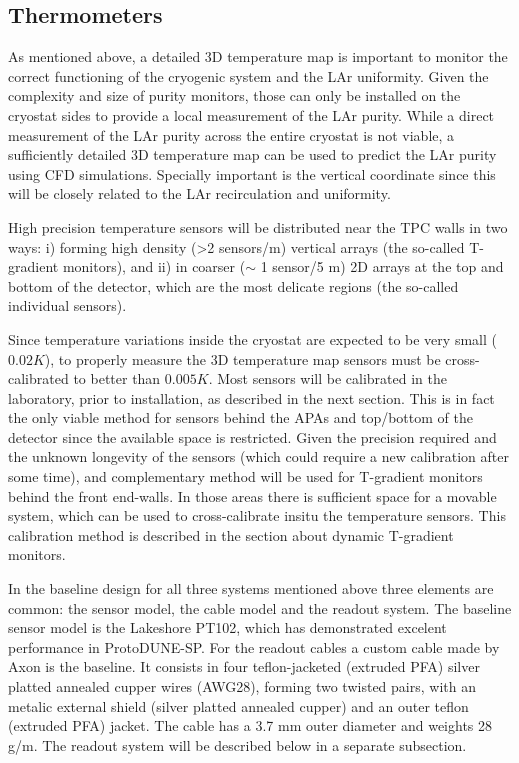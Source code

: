 \subsection{Thermometers}
\label{sec:fdsp-slow-cryo-therm}

As mentioned above, a detailed 3D temperature map is important to monitor the correct functioning of the cryogenic system and the LAr uniformity.
Given the complexity and size of purity monitors, those can only be installed on the cryostat sides to provide a local measurement of
the LAr purity. While a direct measurement of the LAr purity across the entire cryostat is not viable, a sufficiently detailed 3D temperature map
can be used to predict the LAr purity using CFD simulations. Specially important is the vertical coordinate since this will be closely related to
the LAr recirculation and uniformity. 

High precision temperature sensors will be distributed near the TPC walls in two ways:
i) forming high density (>2 sensors/m) vertical arrays (the so-called T-gradient monitors), and ii) in coarser ($\sim$ 1 sensor/5 m) 2D arrays 
at the top and bottom of the detector, which are the most delicate regions (the so-called individual sensors).   

Since temperature variations inside the cryostat are expected to be very small ($0.02 K$), to properly measure the 3D temperature map 
sensors must be cross-calibrated to better than $0.005 K$. Most sensors will be calibrated in the laboratory, prior to installation,
as described in the next section. This is in fact the only viable method for sensors behind the APAs and top/bottom of the detector since the available space is restricted.  
Given the precision required and the unknown longevity of the sensors (which could require a new calibration after some time), and complementary method
will be used for T-gradient monitors behind the front end-walls. In those areas there is sufficient space for a movable system, which can be used to cross-calibrate insitu
the temperature sensors. This calibration method is described in the section about dynamic T-gradient monitors. 

In the baseline design for all three systems mentioned above three elements are common: the sensor model, the cable model and the readout system.
The baseline sensor model is the Lakeshore PT102, which has demonstrated excelent performance in ProtoDUNE-SP.
For the readout cables a custom cable made by Axon is the baseline. It consists in four teflon-jacketed (extruded PFA)
silver platted annealed cupper wires (AWG28), forming two twisted pairs, with an metalic external shield
(silver platted annealed cupper) and an outer teflon (extruded PFA) jacket. The cable has a 3.7 mm outer diameter and weights 28 g/m.
The readout system will be described below in a separate subsection. 

